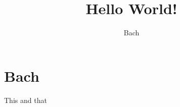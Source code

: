 \documentclass{article}
\title{Hello World!}
\author{Bach}
\begin{document}
\maketitle

\section{Bach}

This and that

\end{document}

